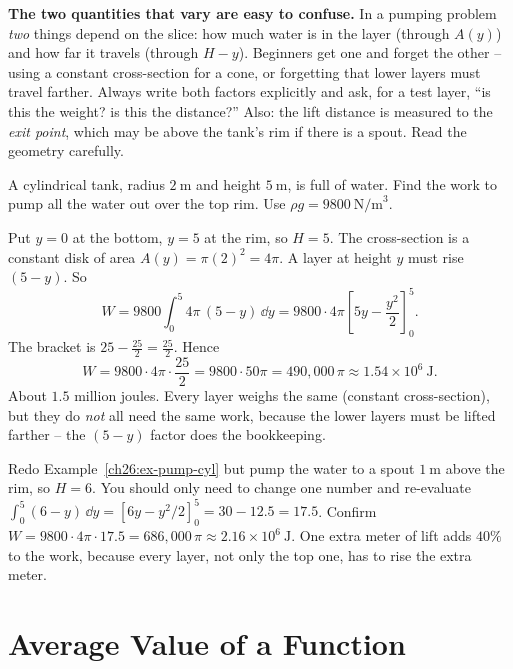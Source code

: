 \begin{trapbox}
\textbf{The two quantities that vary are easy to confuse.} In a pumping problem
\emph{two} things depend on the slice: how much water is in the layer (through
$A(y)$) and how far it travels (through $H-y$). Beginners get one and forget the
other -- using a constant cross-section for a cone, or forgetting that lower layers
must travel farther. Always write both factors explicitly and ask, for a test
layer, ``is this the weight? is this the distance?'' Also: the lift distance is
measured to the \emph{exit point}, which may be above the tank's rim if there is a
spout. Read the geometry carefully.
\end{trapbox}

\begin{example}
\label{ch26:ex-pump-cyl}
A cylindrical tank, radius $2\ \text{m}$ and height $5\ \text{m}$, is full of water.
Find the work to pump all the water out over the top rim. Use $\rho g = 9800\
\text{N/m}^3$.

Put $y=0$ at the bottom, $y=5$ at the rim, so $H=5$. The cross-section is a constant
disk of area $A(y) = \pi(2)^2 = 4\pi$. A layer at height $y$ must rise $(5-y)$. So
\[
  W = 9800\int_0^5 4\pi\,(5-y)\,\dd y
    = 9800\cdot 4\pi\left[5y - \frac{y^2}{2}\right]_0^5.
\]
The bracket is $25 - \tfrac{25}{2} = \tfrac{25}{2}$. Hence
\[
  W = 9800\cdot 4\pi\cdot\frac{25}{2} = 9800\cdot 50\pi = 490{,}000\,\pi
    \approx 1.54\times 10^{6}\ \text{J}.
\]
About $1.5$ million joules. Every layer weighs the same
(constant cross-section), but they do \emph{not} all need the same work, because the
lower layers must be lifted farther -- the $(5-y)$ factor does the bookkeeping.
\end{example}

\begin{labbox}
Redo Example~\ref{ch26:ex-pump-cyl} but pump the water to a spout $1\ \text{m}$
above the rim, so $H=6$. You should only need to change one number and re-evaluate
$\int_0^5 (6-y)\,\dd y = [6y - y^2/2]_0^5 = 30 - 12.5 = 17.5$. Confirm
$W = 9800\cdot 4\pi\cdot 17.5 = 686{,}000\,\pi \approx 2.16\times 10^6\ \text{J}$.
One extra meter of lift adds $40\%$ to the work, because every layer, not only
the top one, has to rise the extra meter.
\end{labbox}

\section{Average Value of a Function}
\label{ch26:average}


